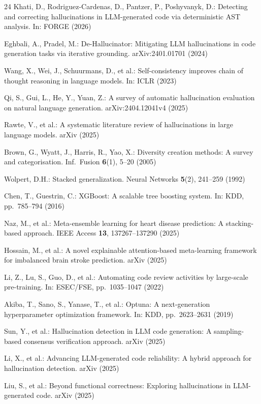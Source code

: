 \documentclass[11pt,a4paper]{article}
\begin{document}
\begin{thebibliography}{24}
Khati, D., Rodriguez-Cardenas, D., Pantzer, P., Poshyvanyk, D.: Detecting and correcting hallucinations in LLM-generated code via deterministic AST analysis. In: FORGE (2026)

Eghbali, A., Pradel, M.: De-Hallucinator: Mitigating LLM hallucinations in code generation tasks via iterative grounding. arXiv:2401.01701 (2024)

Wang, X., Wei, J., Schuurmans, D., et al.: Self-consistency improves chain of thought reasoning in language models. In: ICLR (2023)

Qi, S., Gui, L., He, Y., Yuan, Z.: A survey of automatic hallucination evaluation on natural language generation. arXiv:2404.12041v4 (2025)

Rawte, V., et al.: A systematic literature review of hallucinations in large language models. arXiv (2025)

Brown, G., Wyatt, J., Harris, R., Yao, X.: Diversity creation methods: A survey and categorisation. Inf.\ Fusion \textbf{6}(1), 5--20 (2005)

Wolpert, D.H.: Stacked generalization. Neural Networks \textbf{5}(2), 241--259 (1992)

Chen, T., Guestrin, C.: XGBoost: A scalable tree boosting system. In: KDD, pp.~785--794 (2016)

Naz, M., et al.: Meta-ensemble learning for heart disease prediction: A stacking-based approach. IEEE Access \textbf{13}, 137267--137290 (2025)

Hossain, M., et al.: A novel explainable attention-based meta-learning framework for imbalanced brain stroke prediction. arXiv (2025)

Li, Z., Lu, S., Guo, D., et al.: Automating code review activities by large-scale pre-training. In: ESEC/FSE, pp.~1035--1047 (2022)

Akiba, T., Sano, S., Yanase, T., et al.: Optuna: A next-generation hyperparameter optimization framework. In: KDD, pp.~2623--2631 (2019)

Sun, Y., et al.: Hallucination detection in LLM code generation: A sampling-based consensus verification approach. arXiv (2025)

Li, X., et al.: Advancing LLM-generated code reliability: A hybrid approach for hallucination detection. arXiv (2025)

Liu, S., et al.: Beyond functional correctness: Exploring hallucinations in LLM-generated code. arXiv (2025)

\end{thebibliography}
\end{document}
